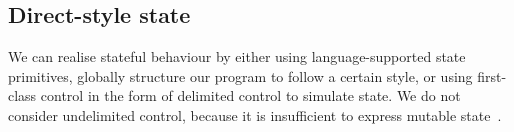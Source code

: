 \documentclass[12pt,phd,lfcs,twoside,openright,logo,leftchapter,normalheadings]{infthesis}
\theoremstyle{plain}
\theoremstyle{definition}
\begin{document}
\subsection{Direct-style state}
\label{sec:direct-style-state}
%
We can realise stateful behaviour by either using language-supported
state primitives, globally structure our program to follow a certain
style, or using first-class control in the form of delimited control
to simulate state. We do not consider undelimited control, because it
is insufficient to express mutable state~\cite{FriedmanS00}.

%


\end{document}
